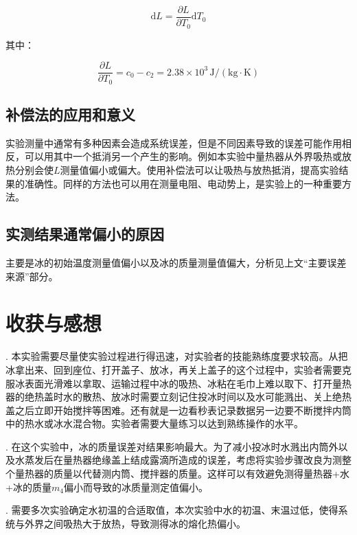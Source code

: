 \documentclass{ctexart}
\begin{document}
\[\mathrm{d}L = \frac{\partial L}{\partial T_0}\mathrm{d}T_0\]

其中：

\[\frac{\partial L}{\partial T_0} = c_0 - c_2 = 2.38\times10^3\,\mathrm{J/(kg\cdot K)}\]

\subsection*{补偿法的应用和意义}

实验测量中通常有多种因素会造成系统误差，但是不同因素导致的误差可能作用相反，可以用其中一个抵消另一个产生的影响。例如本实验中量热器从外界吸热或放热分别会使$L$测量值偏小或偏大。使用补偿法可以让吸热与放热抵消，提高实验结果的准确性。同样的方法也可以用在测量电阻、电动势上，是实验上的一种重要方法。

\subsection*{实测结果通常偏小的原因}

主要是冰的初始温度测量值偏小以及冰的质量测量值偏大，分析见上文“主要误差来源”部分。

\section{收获与感想}

. 本实验需要尽量使实验过程进行得迅速，对实验者的技能熟练度要求较高。从把冰拿出来、回到座位、打开盖子、放冰，再关上盖子的这个过程中，实验者需要克服冰表面光滑难以拿取、运输过程中冰的吸热、冰粘在毛巾上难以取下、打开量热器的绝热盖时水的散热、放冰时需要立刻记住投冰时间以及水可能溅出、关上绝热盖之后立即开始搅拌等困难。还有就是一边看秒表记录数据另一边要不断搅拌内筒中的热水或冰水混合物。实验者需要大量练习以达到熟练操作的水平。

\medskip

. 在这个实验中，冰的质量误差对结果影响最大。为了减小投冰时水溅出内筒外以及水蒸发后在量热器绝缘盖上结成露滴所造成的误差，考虑将实验步骤改良为测整个量热器的质量以代替测内筒、搅拌器的质量。这样可以有效避免测得量热器+水+冰的质量$m_4$偏小而导致的冰质量测定值偏小。

\medskip

. 需要多次实验确定水初温的合适取值，本次实验中水的初温、末温过低，使得系统与外界之间吸热大于放热，导致测得冰的熔化热偏小。
\end{document}
